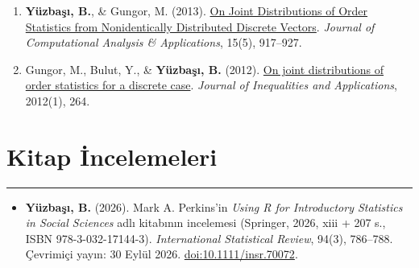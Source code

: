 \documentclass[10pt,a4paper]{article}
\newcommand{\NewPart}[2]{%
	\Needspace{7\baselineskip}%
	\vspace{0.45em}%
	\section*{\sffamily\large\bfseries\color{MidnightBlue}#1 #2}%
	\vspace{-0.7em}\noindent\color{MidnightBlue}\rule{\textwidth}{0.55pt}\color{Black}\vspace{0.25em}}
\newcommand{\ArxivEntry}[3]{
		\noindent #1, ``\href{http://arxiv.org/abs/#3}{#2}'', \textit{{cond-mat/}#3}.}
\newenvironment{etaremune}{\begin{enumerate}}{\end{enumerate}}
\newcommand{\JournalInfo}[2]{\hspace{0.3em}{\small\textsf{[#1; #2]}}}
\begin{document}
\begin{etaremune}
\item {\bf Y\"{u}zba\c{s}{\i}, B.}, \& Gungor, M. (2013). 
\href{http://www.eudoxuspress.com/244/JOCAAA-VOL-15-2013.pdf}
{On Joint Distributions of Order Statistics from Nonidentically Distributed Discrete Vectors}. 
\emph{Journal of Computational Analysis \& Applications}, 15(5), 917--927. \JournalInfo{SCIE}{Q4}
\label{by2013}

\item Gungor, M., Bulut, Y., \& {\bf Y\"{u}zba\c{s}{\i}, B.} (2012). 
\href{https://link.springer.com/article/10.1186/1029-242X-2012-264}
{On joint distributions of order statistics for a discrete case}. 
\emph{Journal of Inequalities and Applications}, 2012(1), 264. \JournalInfo{SCIE}{Q1; WoS/JCR 2025}





\end{etaremune}








\NewPart{Kitap İncelemeleri}{}
\begin{itemize}
\item {\bf Y\"{u}zba\c{s}{\i}, B.} (2026). Mark A. Perkins'in \textit{Using R for Introductory Statistics in Social Sciences} adlı kitabının incelemesi (Springer, 2026, xiii + 207 s., ISBN 978-3-032-17144-3). \textit{International Statistical Review}, 94(3), 786--788. Çevrimiçi yayın: 30 Eylül 2026. \href{https://doi.org/10.1111/insr.70072}{doi:10.1111/insr.70072}. \JournalInfo{SCIE}{Q1}
\end{itemize}
\end{document}
